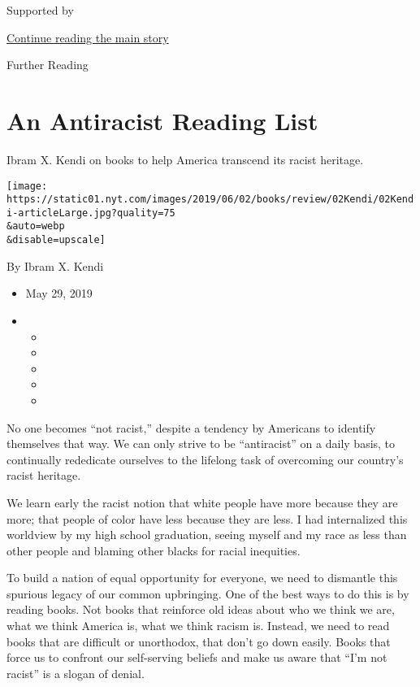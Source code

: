Supported by

\protect\hyperlink{after-sponsor}{Continue reading the main story}

Further Reading

\hypertarget{an-antiracist-reading-list}{%
\section{An Antiracist Reading List}\label{an-antiracist-reading-list}}

Ibram X. Kendi on books to help America transcend its racist heritage.

\texttt{[image: https://static01.nyt.com/images/2019/06/02/books/review/02Kendi/02Kendi-articleLarge.jpg?quality=75\\\&auto=webp\\\&disable=upscale]}

By Ibram X. Kendi

\begin{itemize}
\item
  May 29, 2019
\item
  \begin{itemize}
  \item
  \item
  \item
  \item
  \item
  \end{itemize}
\end{itemize}

No one becomes ``not racist,'' despite a tendency by Americans to
identify themselves that way. We can only strive to be ``antiracist'' on
a daily basis, to continually rededicate ourselves to the lifelong task
of overcoming our country's racist heritage.

We learn early the racist notion that white people have more because
they are more; that people of color have less because they are less. I
had internalized this worldview by my high school graduation, seeing
myself and my race as less than other people and blaming other blacks
for racial inequities.

To build a nation of equal opportunity for everyone, we need to
dismantle this spurious legacy of our common upbringing. One of the best
ways to do this is by reading books. Not books that reinforce old ideas
about who we think we are, what we think America is, what we think
racism is. Instead, we need to read books that are difficult or
unorthodox, that don't go down easily. Books that force us to confront
our self-serving beliefs and make us aware that ``I'm not racist'' is a
slogan of denial.

